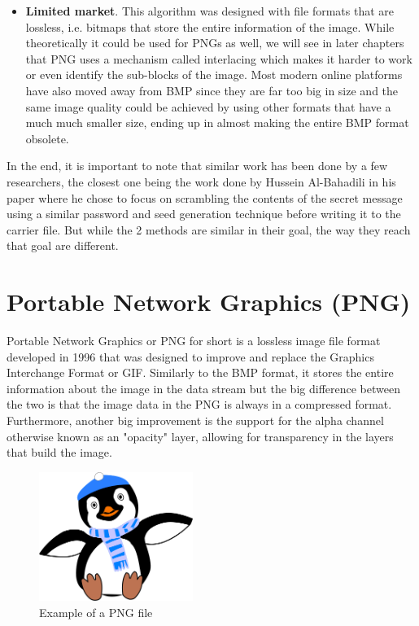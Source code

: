 \begin{multicols*}{2}
\begin{itemize}
  \item \textbf{Limited market}. This algorithm was designed with file formats that are lossless, i.e. bitmaps that store the entire information of the image. While theoretically it could be used for PNGs as well, we will see in later chapters that PNG uses a mechanism called interlacing which makes it harder to work or even identify the sub-blocks of the image. Most modern online platforms have also moved away from BMP since they are far too big in size and the same image quality could be achieved by using other formats that have a much much smaller size, ending up in almost making the entire BMP format obsolete.
\end{itemize}
In the end, it is important to note that similar work has been done by a few researchers, the closest one being the work done by Hussein Al-Bahadili\cite{secure_block_permutation} in his paper where he chose to focus on scrambling the contents of the secret message using a similar password and seed generation technique before writing it to the carrier file. But while the 2 methods are similar in their goal, the way they reach that goal are different.


\section{Portable Network Graphics (PNG)} \label{PNG_Explained_Chapter}
Portable Network Graphics or PNG for short is a lossless image file format developed in 1996 that was designed to improve and replace the Graphics Interchange Format or GIF\cite{rfc2083}. Similarly to the BMP format, it stores the entire information about the image in the data stream but the big difference between the two is that the image data in the PNG is always in a compressed format. Furthermore, another big improvement is the support for the alpha channel otherwise known as an "opacity" layer, allowing for transparency in the layers that build the image.

\begin{figure}[H]
    \centering
    \includegraphics[width=5cm,keepaspectratio]{pics/png_chapter/png_file_example}
    \caption{Example of a PNG file}
    \label{png:example}
\end{figure}


\end{multicols*}
